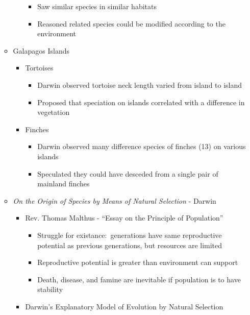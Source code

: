 \documentclass[12pt]{article}
\begin{document}
\begin{itemize}
\begin{itemize}
\begin{itemize}
\begin{itemize}
                    \item Saw similar species in similar habitats
                    \item Reasoned related species could be modified according to the environment
                \end{itemize}
            \end{itemize}
            \item Galapagos Islands
            \begin{itemize}
                \item Tortoises
                \begin{itemize}
                    \item Darwin observed tortoise neck length varied from island to island
                    \item Proposed that speciation on islands correlated with a difference in vegetation
                \end{itemize}
                \item Finches
                \begin{itemize}
                    \item Darwin observed many difference species of finches (13) on various islands
                    \item Speculated they could have desceded from a single pair of mainland finches
                \end{itemize}
            \end{itemize}
            \item \textit{On the Origin of Species by Means of Natural Selection} - Darwin
            \begin{itemize}
                \item Rev. Thomas Malthus - ``Essay on the Principle of Population''
                \begin{itemize}
                    \item Struggle for existance:\ generations have same reproductive potential as previous generations, but resources are limited
                    \item Reproductive potential is greater than environment can support
                    \item Death, disease, and famine are inevitable if population is to have stability
                \end{itemize}
                \item Darwin's Explanatory Model of Evolution by Natural Selection

\end{itemize}
\end{itemize}
\end{itemize}
\end{document}
